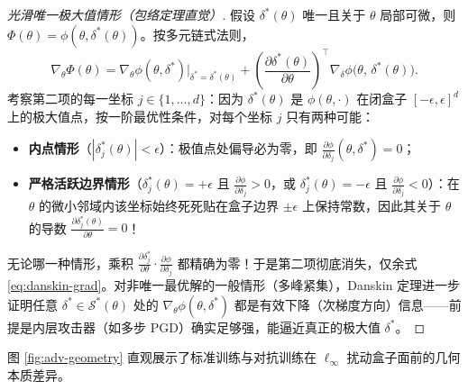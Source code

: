 \begin{proof}[光滑唯一极大值情形（包络定理直觉）]
假设 $\delta^*(\theta)$ 唯一且关于 $\theta$ 局部可微，则 $\Phi(\theta) = \phi(\theta, \delta^*(\theta))$。按多元链式法则，
\[
  \nabla_\theta \Phi(\theta)
  = \nabla_\theta \phi(\theta, \delta^*)\Big|_{\delta^*=\delta^*(\theta)}
  + \left(\frac{\partial \delta^*(\theta)}{\partial \theta}\right)^\top \nabla_\delta \phi\big(\theta,\, \delta^*(\theta)\big).
\]
考察第二项的每一坐标 $j \in \{1,\dots,d\}$：因为 $\delta^*(\theta)$ 是 $\phi(\theta,\cdot)$ 在闭盒子 $[-\epsilon, \epsilon]^d$ 上的极大值点，按一阶最优性条件，对每个坐标 $j$ 只有两种可能：
\begin{itemize}
  \item \textbf{内点情形}（$|\delta^*_j(\theta)| < \epsilon$）：极值点处偏导必为零，即 $\frac{\partial \phi}{\partial \delta_j}(\theta, \delta^*) = 0$；
  \item \textbf{严格活跃边界情形}（$\delta^*_j(\theta) = +\epsilon$ 且 $\frac{\partial \phi}{\partial \delta_j} > 0$，或 $\delta^*_j(\theta) = -\epsilon$ 且 $\frac{\partial \phi}{\partial \delta_j} < 0$）：在 $\theta$ 的微小邻域内该坐标始终死死贴在盒子边界 $\pm \epsilon$ 上保持常数，因此其关于 $\theta$ 的导数 $\frac{\partial \delta^*_j(\theta)}{\partial \theta} = 0$！
\end{itemize}
无论哪一种情形，乘积 $\frac{\partial \delta^*_j}{\partial \theta}\cdot \frac{\partial \phi}{\partial \delta_j}$ 都精确为零！于是第二项彻底消失，仅余式 \eqref{eq:danskin-grad}。对非唯一最优解的一般情形（多峰紧集），Danskin 定理进一步证明任意 $\delta^* \in \mathcal{S}^*(\theta)$ 处的 $\nabla_\theta \phi(\theta,\delta^*)$ 都是有效下降（次梯度方向）信息——前提是内层攻击器（如多步 PGD）确实足够强，能逼近真正的极大值 $\delta^*$。
\end{proof}

图 \ref{fig:adv-geometry} 直观展示了标准训练与对抗训练在 $\ell_\infty$ 扰动盒子面前的几何本质差异。

